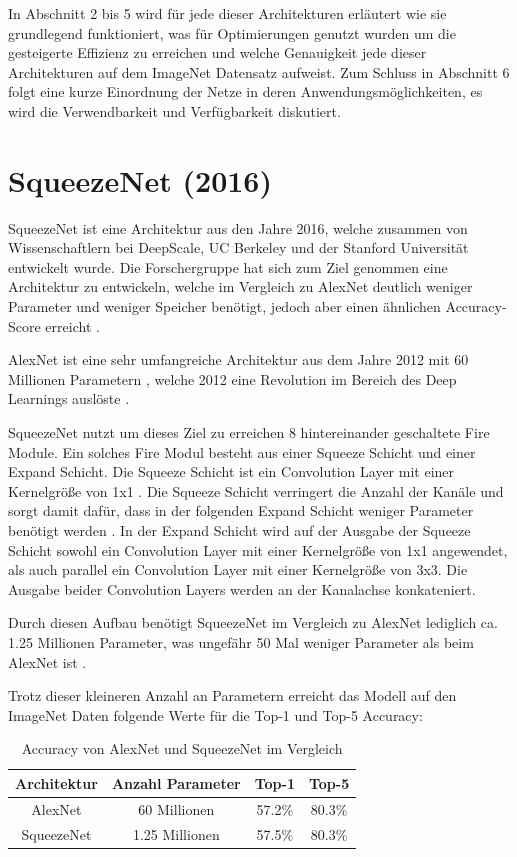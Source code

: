 \documentclass[conference]{IEEEtran}
\begin{document}
In Abschnitt 2 bis 5 wird für jede dieser Architekturen erläutert wie sie grundlegend funktioniert, was für Optimierungen genutzt wurden um die gesteigerte Effizienz zu erreichen und welche Genauigkeit jede dieser Architekturen auf dem ImageNet Datensatz \cite{b3} aufweist.
Zum Schluss in Abschnitt 6 folgt eine kurze Einordnung der Netze in deren Anwendungsmöglichkeiten, es wird die Verwendbarkeit und Verfügbarkeit diskutiert.


\section{SqueezeNet (2016)}
SqueezeNet ist eine Architektur aus den Jahre 2016, welche zusammen von Wissenschaftlern bei DeepScale, UC Berkeley und der Stanford Universität entwickelt wurde.
Die Forschergruppe hat sich zum Ziel genommen eine Architektur zu entwickeln, welche im Vergleich zu AlexNet deutlich weniger Parameter und weniger Speicher benötigt, jedoch aber einen ähnlichen Accuracy-Score erreicht \cite{b1}.

AlexNet ist eine sehr umfangreiche Architektur aus dem Jahre 2012 mit 60 Millionen Parametern \cite{b2}, welche 2012 eine Revolution im Bereich des Deep Learnings auslöste \cite{b4}.

SqueezeNet nutzt um dieses Ziel zu erreichen 8 hintereinander geschaltete Fire Module. Ein solches Fire Modul besteht aus einer Squeeze Schicht und einer Expand Schicht. Die Squeeze Schicht ist ein Convolution Layer mit einer Kernelgröße von 1x1 \cite{b1}. Die Squeeze Schicht verringert die Anzahl der Kanäle und sorgt damit dafür, dass in der folgenden Expand Schicht weniger Parameter benötigt werden \cite{b4}. In der Expand Schicht wird auf der Ausgabe der Squeeze Schicht sowohl ein Convolution Layer mit einer Kernelgröße von 1x1 angewendet, als auch parallel ein Convolution Layer mit einer Kernelgröße von 3x3. Die Ausgabe beider Convolution Layers werden an der Kanalachse konkateniert.

Durch diesen Aufbau benötigt SqueezeNet im Vergleich zu AlexNet lediglich ca. 1.25 Millionen Parameter, was ungefähr 50 Mal weniger Parameter als beim AlexNet ist \cite{b1}.

Trotz dieser kleineren Anzahl an Parametern erreicht das Modell auf den ImageNet Daten \cite{b3} folgende Werte für die Top-1 und Top-5 Accuracy:

\begin{table}[htbp]
\caption{Accuracy von AlexNet und SqueezeNet im Vergleich \cite{b1}}
\begin{center}
\begin{tabular}{|c|c|c|c|}
\hline
Architektur & Anzahl Parameter & Top-1  & Top-5  \\
\hline
AlexNet     & 60 Millionen     & 57.2\% & 80.3\% \\
SqueezeNet  & 1.25 Millionen   & 57.5\% & 80.3\% \\
\hline
\end{tabular}
\end{center}
\end{table}
\end{document}

